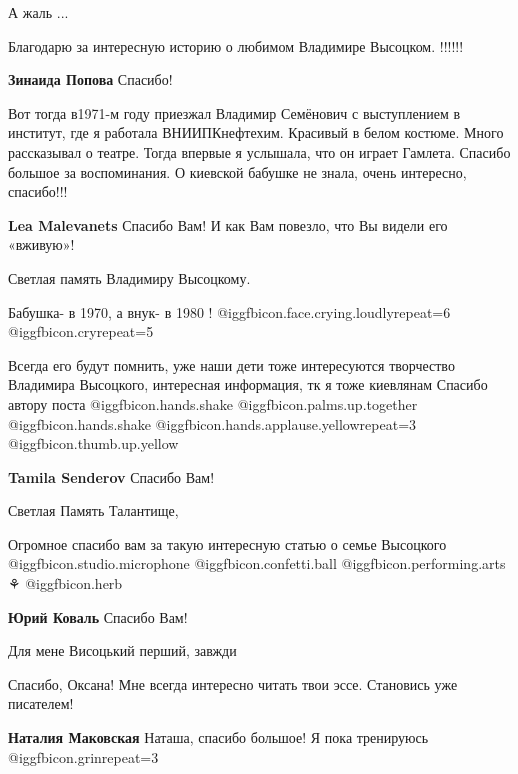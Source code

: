 \begin{itemize}
А жаль ...

Благодарю за интересную историю о любимом Владимире Высоцком. !!!!!!

\textbf{Зинаида Попова} Спасибо!


Вот тогда в1971-м году приезжал Владимир Семёнович с выступлением в институт,
где я работала ВНИИПКнефтехим. Красивый в белом костюме. Много рассказывал о
театре. Тогда впервые я услышала, что он играет Гамлета. Спасибо большое за
воспоминания. О киевской бабушке не знала, очень интересно, спасибо!!!


\textbf{Lea Malevanets} Спасибо Вам! И как Вам повезло, что Вы видели его «вживую»!

Светлая память Владимиру Высоцкому.

Бабушка- в 1970, а внук- в 1980 !  @igg{fbicon.face.crying.loudly}{repeat=6}  @igg{fbicon.cry}{repeat=5} 


Всегда его будут помнить, уже наши дети тоже интересуются творчество Владимира
Высоцкого, интересная информация, тк я тоже киевлянам Спасибо автору поста
 @igg{fbicon.hands.shake}  @igg{fbicon.palms.up.together}  @igg{fbicon.hands.shake}  @igg{fbicon.hands.applause.yellow}{repeat=3}  @igg{fbicon.thumb.up.yellow} 

\textbf{Tamila Senderov} Спасибо Вам!

Светлая Память Талантище,

Огромное спасибо вам за такую интересную статью о семье Высоцкого  @igg{fbicon.studio.microphone} 
@igg{fbicon.confetti.ball}  @igg{fbicon.performing.arts} ⚘ @igg{fbicon.herb} 

\textbf{Юрий Коваль} Спасибо Вам!

Для мене Висоцький перший, завжди

Спасибо, Оксана! Мне всегда интересно читать твои эссе. Становись уже писателем!

\textbf{Наталия Маковская} Наташа, спасибо большое! Я пока тренируюсь @igg{fbicon.grin}{repeat=3} 

\end{itemize} %

